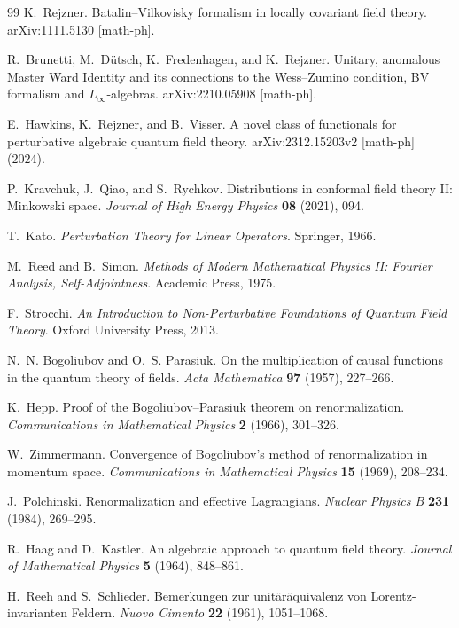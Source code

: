 \begin{thebibliography}{99}
K.~Rejzner.
Batalin--Vilkovisky formalism in locally covariant field theory.
arXiv:1111.5130 [math-ph].

R.~Brunetti, M.~D\"utsch, K.~Fredenhagen, and K.~Rejzner.
Unitary, anomalous Master Ward Identity and its connections to the
Wess--Zumino condition, BV formalism and \(L_\infty\)-algebras.
arXiv:2210.05908 [math-ph].

E.~Hawkins, K.~Rejzner, and B.~Visser.
A novel class of functionals for perturbative algebraic quantum field theory.
arXiv:2312.15203v2 [math-ph] (2024).

P.~Kravchuk, J.~Qiao, and S.~Rychkov.
Distributions in conformal field theory II: Minkowski space.
\emph{Journal of High Energy Physics} \textbf{08} (2021), 094.

T.~Kato.
\emph{Perturbation Theory for Linear Operators}.
Springer, 1966.

M.~Reed and B.~Simon.
\emph{Methods of Modern Mathematical Physics II: Fourier Analysis,
Self-Adjointness}.
Academic Press, 1975.

F.~Strocchi.
\emph{An Introduction to Non-Perturbative Foundations of Quantum Field Theory}.
Oxford University Press, 2013.

N.~N. Bogoliubov and O.~S. Parasiuk.
On the multiplication of causal functions in the quantum theory of fields.
\emph{Acta Mathematica} \textbf{97} (1957), 227--266.

K.~Hepp.
Proof of the Bogoliubov--Parasiuk theorem on renormalization.
\emph{Communications in Mathematical Physics} \textbf{2} (1966), 301--326.

W.~Zimmermann.
Convergence of Bogoliubov's method of renormalization in momentum space.
\emph{Communications in Mathematical Physics} \textbf{15} (1969), 208--234.

J.~Polchinski.
Renormalization and effective Lagrangians.
\emph{Nuclear Physics B} \textbf{231} (1984), 269--295.

R.~Haag and D.~Kastler.
An algebraic approach to quantum field theory.
\emph{Journal of Mathematical Physics} \textbf{5} (1964), 848--861.

H.~Reeh and S.~Schlieder.
Bemerkungen zur unit\"ar\"aquivalenz von Lorentz-invarianten Feldern.
\emph{Nuovo Cimento} \textbf{22} (1961), 1051--1068.


\end{thebibliography}

